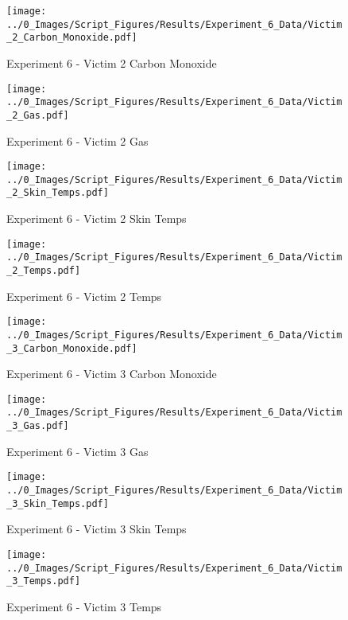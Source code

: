 	\begin{figure}[H]
		\centering
		\texttt{[image: ../0\_Images/Script\_Figures/Results/Experiment\_6\_Data/Victim\_2\_Carbon\_Monoxide.pdf]}
		\caption[]{Experiment 6 - Victim 2 Carbon Monoxide}
	\end{figure}
 
	\clearpage

	\begin{figure}[H]
		\centering
		\texttt{[image: ../0\_Images/Script\_Figures/Results/Experiment\_6\_Data/Victim\_2\_Gas.pdf]}
		\caption[]{Experiment 6 - Victim 2 Gas}
	\end{figure}
 

	\begin{figure}[H]
		\centering
		\texttt{[image: ../0\_Images/Script\_Figures/Results/Experiment\_6\_Data/Victim\_2\_Skin\_Temps.pdf]}
		\caption[]{Experiment 6 - Victim 2 Skin Temps}
	\end{figure}
 
	\clearpage

	\begin{figure}[H]
		\centering
		\texttt{[image: ../0\_Images/Script\_Figures/Results/Experiment\_6\_Data/Victim\_2\_Temps.pdf]}
		\caption[]{Experiment 6 - Victim 2 Temps}
	\end{figure}
 

	\begin{figure}[H]
		\centering
		\texttt{[image: ../0\_Images/Script\_Figures/Results/Experiment\_6\_Data/Victim\_3\_Carbon\_Monoxide.pdf]}
		\caption[]{Experiment 6 - Victim 3 Carbon Monoxide}
	\end{figure}
 
	\clearpage

	\begin{figure}[H]
		\centering
		\texttt{[image: ../0\_Images/Script\_Figures/Results/Experiment\_6\_Data/Victim\_3\_Gas.pdf]}
		\caption[]{Experiment 6 - Victim 3 Gas}
	\end{figure}
 

	\begin{figure}[H]
		\centering
		\texttt{[image: ../0\_Images/Script\_Figures/Results/Experiment\_6\_Data/Victim\_3\_Skin\_Temps.pdf]}
		\caption[]{Experiment 6 - Victim 3 Skin Temps}
	\end{figure}
 
	\clearpage

	\begin{figure}[H]
		\centering
		\texttt{[image: ../0\_Images/Script\_Figures/Results/Experiment\_6\_Data/Victim\_3\_Temps.pdf]}
		\caption[]{Experiment 6 - Victim 3 Temps}
	\end{figure}
 

